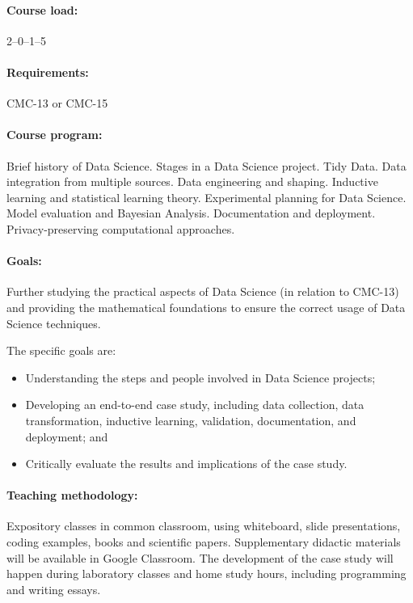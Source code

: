 \paragraph{Course load:} 2--0--1--5

\paragraph{Requirements:} CMC-13 or CMC-15

\paragraph{Course program:}
Brief history of Data Science. Stages in a Data Science project. Tidy Data. Data
integration from multiple sources. Data engineering and shaping. Inductive learning and
statistical learning theory. Experimental planning for Data Science. Model evaluation and
Bayesian Analysis. Documentation and deployment. Privacy-preserving computational
approaches.

\paragraph{Goals:}
Further studying the practical aspects of Data Science (in relation to CMC-13) and providing
the mathematical foundations to ensure the correct usage of Data Science techniques.

The specific goals are:
\begin{itemize}
  \item Understanding the steps and people involved in Data Science projects;
  \item Developing an end-to-end case study, including data collection, data transformation,
    inductive learning, validation, documentation, and deployment; and
  \item Critically evaluate the results and implications of the case study.
\end{itemize}

\paragraph{Teaching methodology:}
Expository classes in common classroom, using whiteboard, slide presentations, coding
examples, books and scientific papers. Supplementary didactic materials will be available
in Google Classroom. The development of the case study will happen during laboratory
classes and home study hours, including programming and writing essays.

